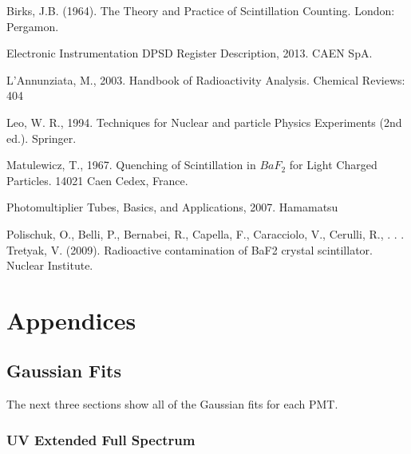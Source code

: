 \documentclass{article}
\begin{document}
\noindent
Birks, J.B. (1964). The Theory and Practice of Scintillation Counting. London:
Pergamon. 

\noindent
Electronic Instrumentation DPSD Register Description, 2013. CAEN SpA.

\noindent
L'Annunziata, M., 2003. Handbook of Radioactivity Analysis. Chemical Reviews: 404

\noindent
Leo, W. R., 1994. Techniques for Nuclear and particle Physics Experiments (2nd ed.). Springer. 

\noindent
Matulewicz, T., 1967. Quenching of Scintillation in $BaF_2$ for Light Charged Particles. 14021 Caen Cedex, France. 

\noindent
Photomultiplier Tubes, Basics, and Applications, 2007. Hamamatsu

\noindent
Polischuk, O., Belli, P., Bernabei, R., Capella, F., Caracciolo, V., Cerulli, R., . . . Tretyak, V. (2009). Radioactive contamination of BaF2 crystal scintillator. Nuclear Institute.


\section{Appendices}

\subsection{Gaussian Fits}

The next three sections show all of the Gaussian fits for each PMT. 

\subsubsection{UV Extended Full Spectrum}
\end{document}
